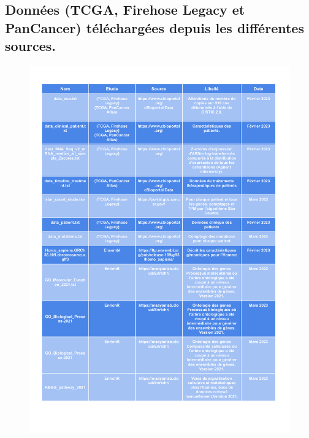 \documentclass{style}
\begin{document}
\subsection{Données (TCGA, Firehose Legacy et PanCancer) téléchargées depuis les différentes sources.}\label{appendix:tabfile}
\begin{figure}[H]
    \centering
    \includegraphics[width=16cm]{images/figures/tabfile1.pdf}
\end{figure}
\newpage
\end{document}
